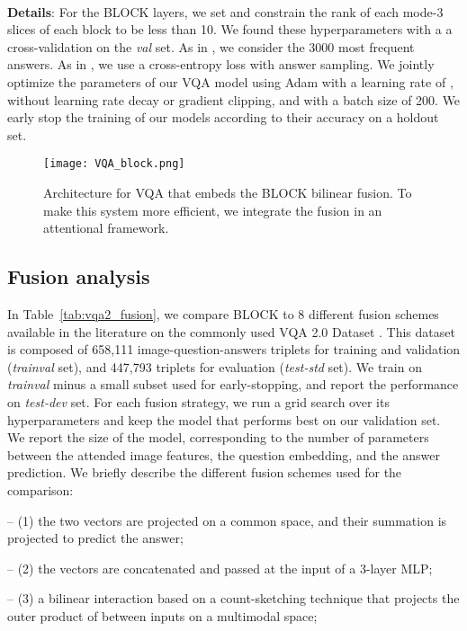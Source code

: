 \documentclass[letterpaper]{article} \usepackage{aaai19}  \usepackage{times}  \usepackage{helvet}  \usepackage{courier}  \usepackage{url}  \usepackage{graphicx}  \usepackage{booktabs}       \usepackage{comment}
\begin{document}
~

\textbf{Details}: For the BLOCK layers, we set  and constrain the rank of each mode-3 slices of each block to be less than 10. We found these hyperparameters with a a cross-validation on the \textit{val} set.
As in \cite{yu2018beyond}, we consider the 3000 most frequent answers. As in \cite{benyounescadene2017mutan}, we use a cross-entropy loss with answer sampling.
We jointly optimize the parameters of our VQA model using Adam \cite{KingmaB14} with a learning rate of , without learning rate decay or gradient clipping, and with a batch size of 200. We early stop the training of our models according to their accuracy on a holdout set.

\begin{figure}
    \centering
    \texttt{[image: VQA\_block.png]}
    \caption{\label{fig:vqa_fusion} Architecture for VQA that embeds the BLOCK bilinear fusion. To make this system more efficient, we integrate the fusion in an attentional framework.}
\end{figure}

\subsection{Fusion analysis}
In Table~\ref{tab:vqa2_fusion}, we compare BLOCK to 8 different fusion schemes available in the literature on the commonly used VQA 2.0 Dataset \cite{Goyal_2017_CVPR}. This dataset is composed of 658,111 image-question-answers triplets for training and validation (\textit{trainval} set), and 447,793 triplets for evaluation (\textit{test-std} set). We train on \textit{trainval} minus a small subset used for early-stopping, and report the performance on \textit{test-dev} set. For each fusion strategy, we run a grid search over its hyperparameters and keep the model that performs best on our validation set. We report the size of the model, corresponding to the number of parameters between the attended image features, the question embedding, and the answer prediction. We briefly describe the different fusion schemes used for the comparison:

-- (1) the two vectors are projected on a common space, and their summation is projected to predict the answer; 

-- (2) the vectors are concatenated and passed at the input of a 3-layer MLP; 

-- (3) a bilinear interaction based on a count-sketching technique that projects the outer product of between inputs on a multimodal space;
\end{document}
